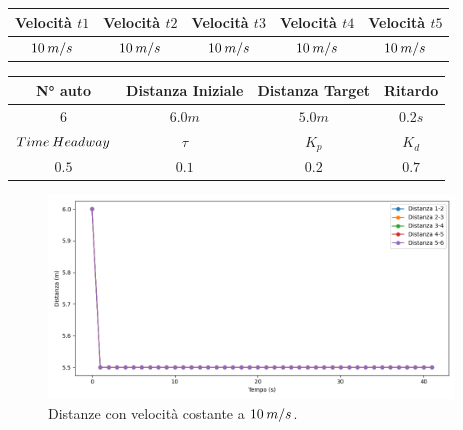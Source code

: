 \begin{table}[h]
    \centering
    \begin{tabular}{|c|c|c|c|c|}
        \hline
        Velocità $t1$ & Velocità $t2$ & Velocità $t3$ &Velocità $t4$ &Velocità $t5$\\
        \hline
            $10\hspace{0.2em}m/s$ & $10\hspace{0.2em}m/s$ & $10\hspace{0.2em}m/s$ & $10\hspace{0.2em}m/s$ & $10\hspace{0.2em}m/s$ \\
        \hline
    \end{tabular}
\end{table}
\begin{table}[h]
    \centering
    \begin{tabular}{|c|c|c|c|}
        \hline
        N° auto & Distanza Iniziale & Distanza Target & Ritardo \\
        \hline
        $6$ & $6.0 m$ & $5.0 m$ & $0.2 s$ \\
        \hline
        $Time\hspace{0.2em}Headway$ & $\tau$ & $K_p$ & $K_d$  \\
        \hline
        $0.5$ & $0.1$ & $0.2$ & $0.7$ \\
        \hline
    \end{tabular}
\end{table}

\begin{figure}[H]
    \includegraphics[width=0.96\textwidth]{images/5-experiment/velocity/distance_10-10-10-10-10.png}
    \caption{Distanze con velocità costante a $10\hspace{0.2em}m/s$.}
    \label{fig:10-constvelocity-distance}
\end{figure}


